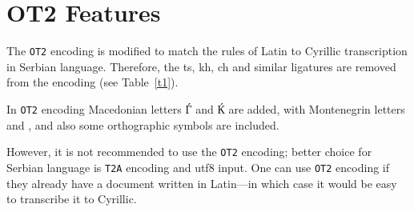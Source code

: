 \documentclass{article}
\begin{document}
	\section{OT2 Features}
	
	The \texttt{OT2} encoding is modified to match the rules of Latin to Cyrillic transcription in Serbian language. Therefore, the \textsf{ts}, \textsf{kh}, \textsf{ch} and similar ligatures are removed from the encoding (see Table~\ref{t1}).
	
	In \texttt{OT2} encoding Macedonian letters {\selectfont Ѓ} and {\selectfont Ќ} are added, with Montenegrin letters {\selectfont\CYRSJE} and {\selectfont\CYRZJE}, and also some orthographic symbols are included.
	
	However, it is not recommended to use the \texttt{OT2} encoding; better choice for Serbian language is \texttt{T2A} encoding and utf8 input. One can use \texttt{OT2} encoding if they already have a document written in Latin---in which case it would be easy to transcribe it to Cyrillic.
	
\end{document}
